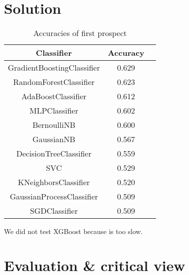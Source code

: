 \documentclass[12pt]{article}
\begin{document}
\section{Solution}

\begin{table}[h!]
    \centering
    \begin{tabular}{ccc}
        \toprule
        \textbf{Classifier}        & \textbf{Accuracy} \\ \midrule
        GradientBoostingClassifier & 0.629             \\
        RandomForestClassifier     & 0.623             \\
        AdaBoostClassifier         & 0.612             \\
        MLPClassifier              & 0.602             \\
        BernoulliNB                & 0.600             \\
        GaussianNB                 & 0.567             \\
        DecisionTreeClassifier     & 0.559             \\
        SVC                        & 0.529             \\
        KNeighborsClassifier       & 0.520             \\
        GaussianProcessClassifier  & 0.509             \\
        SGDClassifier              & 0.509             \\ \bottomrule
    \end{tabular}
    \caption{Accuracies of first prospect}
\end{table}
We did not test XGBoost because is too slow.

\section{Evaluation \& critical view}
\end{document}

